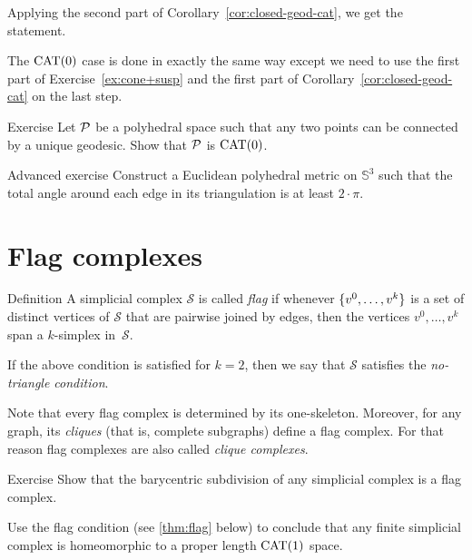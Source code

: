 Applying the second part of Corollary~\ref{cor:closed-geod-cat},
we get the statement.

The $\mathrm{CAT}(0)$ case is done in exactly the same way except we need to use the first part of Exercise~\ref{ex:cone+susp} and  the first part of Corollary~\ref{cor:closed-geod-cat} on the last step.
\qeds

\begin{thm}{Exercise}\label{ex:unique-geod=CAT}
Let $\mathcal{P}$
be a polyhedral space such that any two points can be connected by a unique geodesic.
Show that $\mathcal{P}$ is $\mathrm{CAT}(0)$.
\end{thm}

\begin{thm}{Advanced exercise}\label{ex:S3}
Construct a Euclidean polyhedral metric on $\mathbb{S}^3$
such that the total angle around each edge in its triangulation is at least $2\cdot \pi$.
\end{thm}


\section{Flag complexes}


\begin{thm}{Definition}\label{def:flag}
A simplicial complex $\mathcal{S}$ 
is called \emph{flag} if whenever $\{v^0,\z\dots,v^k\}$
is a set of distinct vertices of $\mathcal{S}$
that are pairwise joined by edges, then the vertices $v^0,\dots,v^k$
span a $k$-simplex in~$\mathcal{S}$.

If the above condition is satisfied for $k=2$, 
then we say that $\mathcal{S}$ satisfies 
the \emph{no-triangle condition}.
\end{thm}

Note that every flag complex is determined by its one-skeleton.
Moreover, for any graph, its \emph{cliques} (that is, complete subgraphs) define a flag complex.
For that reason  flag complexes are also called  \emph{clique complexes}.

\begin{thm}{Exercise}\label{ex:baricenric-flag}
Show that the barycentric subdivision of any simplicial complex is a flag complex.

Use the flag condition (see \ref{thm:flag} below)
to conclude that any finite simplicial complex is homeomorphic to a proper length $\mathrm{CAT}(1)$ space.

\end{thm}


